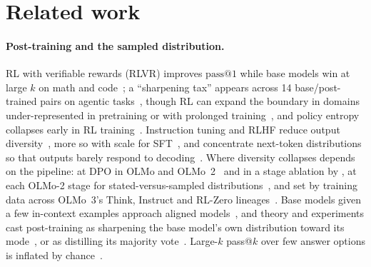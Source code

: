 \documentclass[wcp]{jmlr}
\makeatletter
\newcommand{\passk}[1]{\mathrm{pass@}#1}
\makeatother
\begin{document}
\section{Related work}
\paragraph{Post-training and the sampled distribution.}
RL with verifiable rewards (RLVR) improves $\passk{1}$ while base models win at large $k$ on math and code~\citep{yue2025rlboundary,wu2025invisibleleash}; a ``sharpening tax'' appears across 14 base/post-trained pairs on agentic tasks~\citep{oh2026sharpeningtax}, though RL can expand the boundary in domains under-represented in pretraining or with prolonged training~\citep{cheng2025guru,liu2025prorl}, and policy entropy collapses early in RL training~\citep{cui2025entropy}. Instruction tuning and RLHF reduce output diversity~\citep{kirk2024rlhfdiversity,west2025basemodels,jiang2025hivemind,murthy2025onefish}, more so with scale for SFT~\citep{springer2026annotations}, and concentrate next-token distributions so that outputs barely respond to decoding~\citep{yang2026concentration}. Where diversity collapses depends on the pipeline: at DPO in OLMo and OLMo~2~\citep{peeperkorn2025mind} and in a stage ablation by \citet{liu2026alignmenttax}, at each OLMo-2 stage for stated-versus-sampled distributions~\citep{jang2026cannotsample}, and set by training data across OLMo~3's Think, Instruct and RL-Zero lineages~\citep{karouzos2026where}. Base models given a few in-context examples approach aligned models~\citep{lin2023urial}, and theory and experiments cast post-training as sharpening the base model's own distribution toward its mode~\citep{huang2024sharpening,agarwal2025entropy,karan2025sampling}, or as distilling its majority vote~\citep{prasad2025scpo}. Large-$k$ pass@$k$ over few answer options is inflated by chance~\citep{dragoi2025beyondpassk}.
\end{document}
